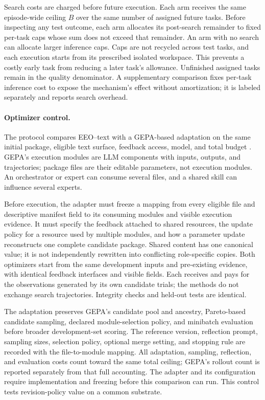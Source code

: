 Search costs are charged before future execution. Each arm receives the same episode-wide ceiling $B$ over the same number of assigned future tasks. Before inspecting any test outcome, each arm allocates its post-search remainder to fixed per-task caps whose sum does not exceed that remainder. An arm with no search can allocate larger inference caps. Caps are not recycled across test tasks, and each execution starts from its prescribed isolated workspace. This prevents a costly early task from reducing a later task's allowance. Unfinished assigned tasks remain in the quality denominator. A supplementary comparison fixes per-task inference cost to expose the mechanism's effect without amortization; it is labeled separately and reports search overhead.

\paragraph{Optimizer control.}
The protocol compares EEO--text with a GEPA-based adaptation on the same initial package, eligible text surface, feedback access, model, and total budget \citep{gepa}. GEPA's execution modules are LLM components with inputs, outputs, and trajectories; package files are their editable parameters, not execution modules. An orchestrator or expert can consume several files, and a shared skill can influence several experts.

Before execution, the adapter must freeze a mapping from every eligible file and descriptive manifest field to its consuming modules and visible execution evidence. It must specify the feedback attached to shared resources, the update policy for a resource used by multiple modules, and how a parameter update reconstructs one complete candidate package. Shared content has one canonical value; it is not independently rewritten into conflicting role-specific copies. Both optimizers start from the same development inputs and pre-existing evidence, with identical feedback interfaces and visible fields. Each receives and pays for the observations generated by its own candidate trials; the methods do not exchange search trajectories. Integrity checks and held-out tests are identical.

The adaptation preserves GEPA's candidate pool and ancestry, Pareto-based candidate sampling, declared module-selection policy, and minibatch evaluation before broader development-set scoring. The reference version, reflection prompt, sampling sizes, selection policy, optional merge setting, and stopping rule are recorded with the file-to-module mapping. All adaptation, sampling, reflection, and evaluation costs count toward the same total ceiling; GEPA's rollout count is reported separately from that full accounting. The adapter and its configuration require implementation and freezing before this comparison can run. This control tests revision-policy value on a common substrate.


